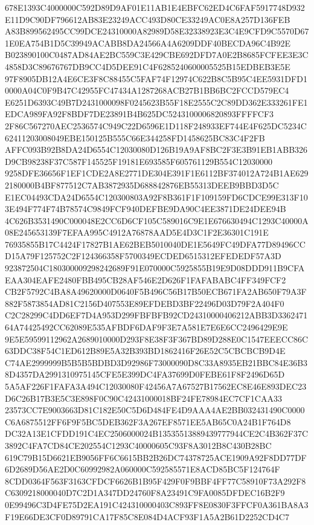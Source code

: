 \documentclass[UTF8,fontset=fandol,zihao=-4,a4paper]{ctexart}
\begin{document}
{{678E1393C4000000C592D89D9AF01E11AB1E4EBFC62ED4C6FAF5917748D932E11D9C90DF796612AB83E23249ACC493D80CE33249AC0E8A257D136FEB
A83B899562495CC99DCE24310000A82989D58E32338923E3C4E9CFD9C5570D671E0EA754B1D5C39949ACABB8DA24566A4A6209DDF40BECDA96C4B92E
B023890100C0487AD84AE2BC559C3E429CBE692DFD7A0E2B8685FCFEE3E3C4858D3C89676767DB9CC4D5DEE91C4F6285240600005525B15EDBEB3E5E
97F8905DB12A4E6CE3F8C88455C5FAF74F12974C622B8C5B95C4EE5931DFD10000A04C0F9B47C42955FC47434A1287268ACB27B1BB6BC2FCCD579EC4
E6251D6393C49B7D2431000098F0245623B55F18E2555C2C89DD362E333261FE1EDCA989FA92F8BDF7DE23891B4B625DC5243100006820893FFFFCF3
2F86C567270AEC2536574C949C22D6596E1D118F248933EF744E4F625DC5234C62411203008049EBE150125B555C66E344258FD1458625BC83C4F2FB
AFFC093B92B8DA24D6554C12030080D126B19A9AF8BC2F3E3B91EB1ABB326D9CB98238F37C587F145525F19181E693585F605761129B554C12030000
9258DFE36656F1EF1CDE2A8E2771DE304E391F1E6112BF374012A724B1AE6292180000B4BF877512C7AB3872935D688842876EB55313DEEB9BBD3D5C
E1EC04493CDA24D6554C120300803A92F8B361F1F109159FD6CDCE99E313F103E494F774F74B78574C9849FCF940DEFBE9DA90C4EE3871DE24DEE94B
4C626B3531490C000048E2CC6D6CF105C589016C9E1E676630494C1293C40000A08E245653139F7EFAA995C4912A76878AAD5E4D3C1F2E36301C191E
76935855B17C4424F17827B1AE62BEB5010040DE1E5649FC49DFA77D89496CCD15A79F125752C2F124366358F5700349ECDED6515312EFEDEDF57A3D
923872504C180300009298242689F91E070000C5925855B19E9D08DDD911B9CFAEAA304EAFE2480FBB495CB28AF546E2D626F1FAFABABC4FF349FCF2
CB2F5792C4BA8A49620000D0640F5B496C56B17B50ECB671FA2AB650F79A3F882F5873854AD81C2156D407553E89EFDEBD3BF22496D03D79F2A404F0
C2C28299C4DD6EF7D4A953D299FBFBFB92CD24310000406212ABB3D336247164A74425492CC62089E535AFBDF6DAF9F3E7A581E7E6E6CC2496429E9E
9E5E59599112962A2689010000D293F8E38F3F367BD89D288E0C1547EEECC86C63DDC38F54C1ED612B89E5A32B393BD1862416F26E52C5CBCBCB9D4E
C74AE2999999B5B5B5BDBD3D92986F73000090D8C33A8935EB21BBC84E36B38D4357DA2991310975145CFE5E399DC4FA37699D0FEBE61F8F2496D65D
5A5AF226F1FAFA3A494C12030080F42456A7A67527B17562EC8E46E893DEC23D6C26B17B3E5C3E898F0C90C42431000018BF24FE78984EC7CF1CAA33
23573CC7E9003663D81C182E50C5D6D484FE4D9AAA4AE2BB032431490C0000C6A6875512FF6F9F5BC5DEB362F3A267EF8571EE5AB65C0A24B1F764D8
DC32A13E1CFDD191C4EC2506000024B13535513889439777944CE2C4B362F37C3892C4FA7CD84CE202554C1293C40000605C93F8A3012B8C430B28BC
619C79B15D6621EB9056FF6C6615BB2B26DC74378725ACE1909A92F8DD77DF6D2689D56AE2D0C60992982A060000C592585571E8ACD85BC5F124764F
8CDD0364F563F3163CFDCF6626B1B95F429F0F9BBF4FF77C58910F73A292F8C6309218000040D7C2D1A347DD24760F8A23491C9FA0085DFDEC16B2F9
0E99496C3D4FE75D2EA191C424310000403C893FF8E0830F3FFCF0A361BA8A3F19E66DE3CF0D89791CA17F85C8E084D4ACF93F1A5A2B61D2252CD4C7
}}
\end{document}
